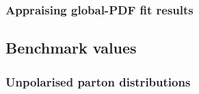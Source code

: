 {\subsubsection{Appraising global-PDF fit results}
\label{subsubsec:GPDFfits}

\subsection{Benchmark values}
\label{subsec:BN}

\subsubsection{Unpolarised parton distributions}

%
%
%


}
